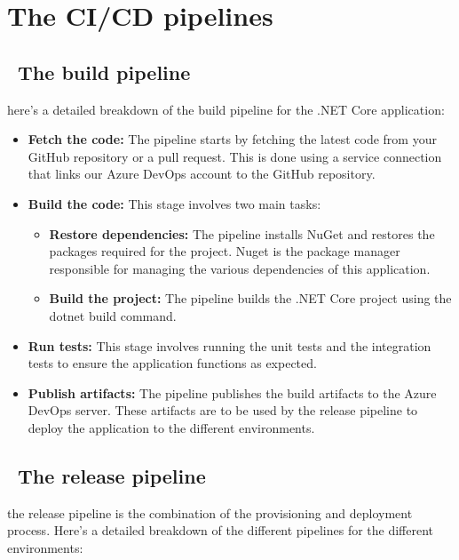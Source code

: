 \section{The CI/CD pipelines}

\subsection*{ \textbullet\ The build pipeline}
here's a detailed breakdown of the build pipeline for the .NET Core application:
\begin{itemize}
    \item \textbf{Fetch the code:} The pipeline starts by fetching the latest code from your GitHub repository or a pull request. This is done using a service connection that links our Azure DevOps account to the GitHub repository.
    \item \textbf{Build the code:} This stage involves two main tasks:
          \begin{itemize}
              \item \textbf{Restore dependencies:} The pipeline installs NuGet and restores the packages required for the project. Nuget is the package manager responsible for managing the various dependencies of this application.
              \item \textbf{Build the project:} The pipeline builds the .NET Core project using the dotnet build command.
          \end{itemize}
    \item \textbf{Run tests:} This stage involves running the unit tests and the integration tests to ensure the application functions as expected.
    \item \textbf{Publish artifacts:} The pipeline publishes the build artifacts to the Azure DevOps server. These artifacts are to be used by the release pipeline to deploy the application to the different environments.
\end{itemize}
\subsection*{ \textbullet\ The release pipeline}
the release pipeline is the combination of the provisioning and deployment process. Here's a detailed breakdown of the different pipelines for the different environments:
